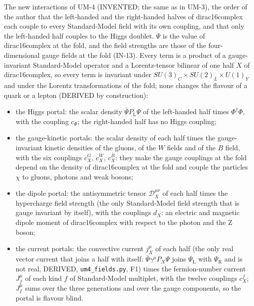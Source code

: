 \documentclass[
  10pt,
]{article}
\providecommand{\tightlist}{%
  \setlength{\itemsep}{0pt}\setlength{\parskip}{0pt}}
\begin{document}
The new interactions of UM-4 (INVENTED; the same as in UM-3), the order
of the author that the left-handed and the right-handed halves of
dirac16complex each couple to every Standard-Model field with its own
coupling, and that only the left-handed half couples to the Higgs
doublet. \(\Psi\) is the value of dirac16complex at the fold, and the
field strengths are those of the four-dimensional gauge fields at the
fold (IN-13). Every term is a product of a gauge-invariant
Standard-Model operator and a Lorentz-tensor bilinear of one half \(X\)
of dirac16complex, so every term is invariant under
\(SU(3)_C \times SU(2)_L \times U(1)_Y\) and under the Lorentz
transformations of the fold; none changes the flavour of a quark or a
lepton (DERIVED by construction):

\begin{itemize}
\tightlist
\item
  the Higgs portal: the scalar density \(\bar\Psi P_{\mathrm{L}}\Psi\)
  of the left-handed half times \(\Phi^\dagger\Phi\), with the coupling
  \(c_\Phi\); the right-handed half has no Higgs coupling;
\item
  the gauge-kinetic portals: the scalar density of each half times the
  gauge-invariant kinetic densities of the gluons, of the \(W\) fields
  and of the \(B\) field, with the six couplings \(c^{G}_X\),
  \(c^{W}_X\), \(c^{B}_X\): they make the gauge couplings at the fold
  depend on the density of dirac16complex at the fold and couple the
  particles \(\chi\) to gluons, photons and weak bosons;
\item
  the dipole portal: the antisymmetric tensor \(\mathcal{D}_X^{\mu\nu}\)
  of each half times the hypercharge field strength (the only
  Standard-Model field strength that is gauge invariant by itself), with
  the couplings \(d_X\): an electric and magnetic dipole moment of
  dirac16complex with respect to the photon and the Z boson;
\item
  the current portals: the convective current \(j_X^\mu\) of each half
  (the only real vector current that joins a half with itself:
  \(\bar\Psi\gamma^\mu P_X\Psi\) joins \(\Psi_{\mathrm{L}}\) with
  \(\Psi_{\mathrm{R}}\) and is not real, DERIVED,
  \texttt{um4\_fields.py}, F1) times the fermion-number current
  \(J_f^\mu\) of each kind \(f\) of Standard-Model multiplet, with the
  twelve couplings \(c^{f}_X\); \(J_f^\mu\) sums over the three
  generations and over the gauge components, so the portal is flavour
  blind.
\end{itemize}
\end{document}
